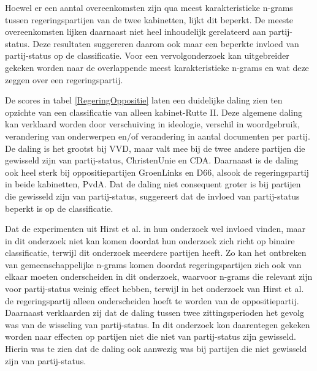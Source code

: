 Hoewel er een aantal overeenkomsten zijn qua meest karakteristieke n-grams tussen regeringspartijen van de twee kabinetten, lijkt dit beperkt. De meeste overeenkomsten lijken daarnaast niet heel inhoudelijk gerelateerd aan partij-status. Deze resultaten suggereren daarom ook maar een beperkte invloed van partij-status op de classificatie. Voor een vervolgonderzoek kan uitgebreider gekeken worden naar de overlappende meest karakteristieke n-grams en wat deze zeggen over een regeringspartij.\par
De scores in tabel \ref{RegeringOppositie} laten een duidelijke daling zien ten opzichte van een classificatie van alleen kabinet-Rutte II. Deze algemene daling kan verklaard worden door verschuiving in ideologie, verschil in woordgebruik, verandering van onderwerpen en/of verandering in aantal documenten per partij. De daling is het grootst bij VVD, maar valt mee bij de twee andere partijen die gewisseld zijn van partij-status, ChristenUnie en CDA. Daarnaast is de daling ook heel sterk bij oppositiepartijen GroenLinks en D66, alsook de regeringspartij in beide kabinetten, PvdA. Dat de daling niet consequent groter is bij partijen die gewisseld zijn van partij-status, suggereert dat de invloed van partij-status beperkt is op de classificatie.\par
Dat de experimenten uit Hirst et al. in hun onderzoek wel invloed vinden, maar in dit onderzoek niet kan komen doordat hun onderzoek zich richt op binaire classificatie, terwijl dit onderzoek meerdere partijen heeft. Zo kan het ontbreken van gemeenschappelijke n-grams komen doordat regeringspartijen zich ook van elkaar moeten onderscheiden in dit onderzoek, waarvoor n-grams die relevant zijn voor partij-status weinig effect hebben, terwijl in het onderzoek van Hirst et al. de regeringspartij alleen onderscheiden hoeft te worden van de oppositiepartij. Daarnaast verklaarden zij dat de daling tussen twee zittingsperioden het gevolg was van de wisseling van partij-status. In dit onderzoek kon daarentegen gekeken worden naar effecten op partijen niet die niet van partij-status zijn gewisseld. Hierin was te zien dat de daling ook aanwezig was bij partijen die niet gewisseld zijn van partij-status.\par

